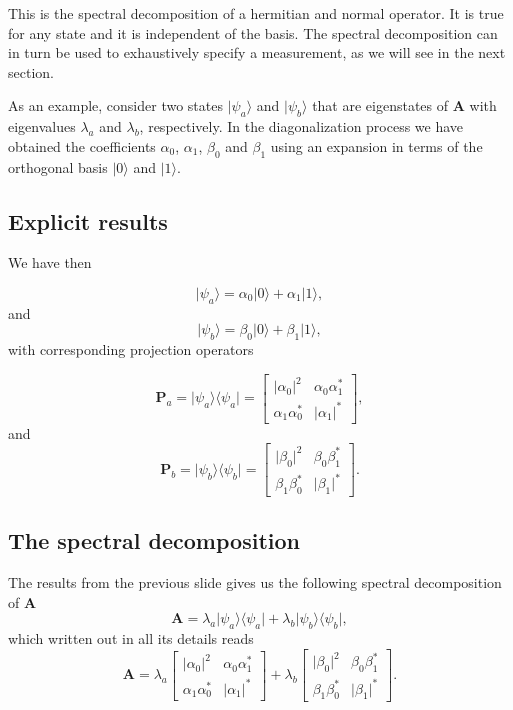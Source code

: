 This is the spectral decomposition of a hermitian and normal
operator. It is true for any state and it is independent of the
basis. The spectral decomposition can in turn be used to exhaustively
specify a measurement, as we will see in the next section.

As an example, consider two states $\vert \psi_a\rangle$ and $\vert
\psi_b\rangle$ that are eigenstates of $\bm{A}$ with eigenvalues
$\lambda_a$ and $\lambda_b$, respectively. In the diagonalization
process we have obtained the coefficients $\alpha_0$, $\alpha_1$,
$\beta_0$ and $\beta_1$ using an expansion in terms of the orthogonal
basis $\vert 0\rangle$ and $\vert 1\rangle$.

\subsection{Explicit results}

We have then

\[
\vert \psi_a\rangle = \alpha_0\vert 0\rangle+\alpha_1\vert 1\rangle,
\]
and
\[
\vert \psi_b\rangle = \beta_0\vert 0\rangle+\beta_1\vert 1\rangle,
\]
with corresponding projection operators

\[
\bm{P}_a=\vert \psi_a\rangle \langle \psi_a\vert = \begin{bmatrix} \vert \alpha_0\vert^2 &\alpha_0\alpha_1^* \\
                                                                   \alpha_1\alpha_0^* & \vert \alpha_1\vert^* \end{bmatrix},
\]    
and
\[
\bm{P}_b=\vert \psi_b\rangle \langle \psi_b\vert = \begin{bmatrix} \vert \beta_0\vert^2 &\beta_0\beta_1^* \\
                                                                   \beta_1\beta_0^* & \vert \beta_1\vert^* \end{bmatrix}.
\]

\subsection{The spectral decomposition}

The results from the previous slide gives us
the following spectral decomposition of $\bm{A}$
\[
\bm{A}=\lambda_a \vert \psi_a\rangle \langle \psi_a\vert+\lambda_b \vert \psi_b\rangle \langle \psi_b\vert,
\]
which written out in all its details reads
\[
\bm{A}=\lambda_a\begin{bmatrix} \vert \alpha_0\vert^2 &\alpha_0\alpha_1^* \\
                                                                   \alpha_1\alpha_0^* & \vert \alpha_1\vert^* \end{bmatrix} +\lambda_b\begin{bmatrix} \vert \beta_0\vert^2 &\beta_0\beta_1^* \\
                                                                   \beta_1\beta_0^* & \vert \beta_1\vert^* \end{bmatrix}.
\]

